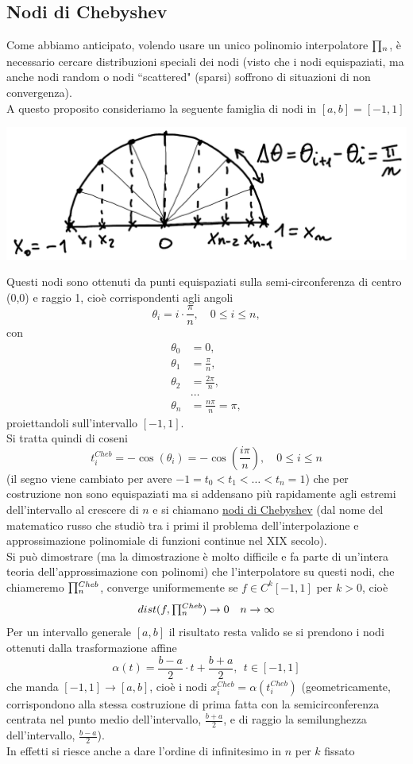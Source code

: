 \subsection{Nodi di Chebyshev}
Come abbiamo anticipato, volendo usare un unico polinomio interpolatore $\begin{matrix}\prod\end{matrix}_n$, è necessario cercare distribuzioni speciali dei nodi (visto che i nodi equispaziati, ma anche nodi random o nodi ``scattered" (sparsi) soffrono di situazioni di non convergenza).\\
A questo proposito consideriamo la seguente famiglia di nodi in $[a,b]=[-1,1]$
\begin{center}
    \includegraphics[scale=0.5]{foto/pag-16}
\end{center}
Questi nodi sono ottenuti da punti equispaziati sulla semi-circonferenza di centro (0,0) e raggio 1, cioè corrispondenti agli angoli 
\[\theta_i=i\cdot \frac{\pi}{n}, \quad 0\leq i\leq n,\] 
con 
\[\begin{split}
    \theta_0 & = 0, \\
    \theta_1 & = \frac{\pi}{n}, \\
    \theta_2 & = \frac{2\pi}{n}, \\
    & \dotso \\
    \theta_n & = \frac{n\pi}{n}=\pi,
\end{split}\]
 proiettandoli sull'intervallo $[-1,1]$.\\ 
 Si tratta quindi di coseni 
\[ t_i^{Cheb}=-\cos(\theta_i)=-\cos\left(\frac{i\pi}{n}\right),\quad 0\leq i\leq n \]
(il segno viene cambiato per avere $-1=t_0< t_1<\dotso<t_n=1$) che per costruzione non sono equispaziati ma si addensano  più rapidamente agli estremi dell'intervallo al crescere di $n$ e si chiamano \uline{nodi di Chebyshev} (dal nome del matematico russo che studiò tra i primi il problema dell'interpolazione e approssimazione polinomiale di funzioni continue nel XIX secolo).\\ 
Si può dimostrare (ma la dimostrazione è molto difficile e fa parte di un'intera teoria dell'approssimazione con polinomi) che l'interpolatore su questi nodi, che chiameremo $\begin{matrix}\prod\end{matrix}_n^{Cheb}$, converge uniformemente se $f\in C^k[-1,1]$ per $k>0$, cioè
\[ dist(f,\begin{matrix}\prod\end{matrix}_n^{Cheb})\rightarrow 0 \quad n\rightarrow\infty \]
Per un intervallo generale $[a,b]$ il risultato resta valido se si prendono i nodi ottenuti dalla trasformazione affine
\[ \alpha(t)=\frac{b-a}{2}\cdot t+\frac{b+a}{2},\ \ t\in[-1,1] \]
che manda $[-1,1] \rightarrow [a,b]$, cioè i nodi $x_i^{Cheb}=\alpha(t_i^{Cheb})$ (geometricamente, corrispondono alla stessa costruzione di prima fatta con la semicirconferenza centrata nel punto medio dell'intervallo, $\frac{b+a}{2}$, e di raggio la semilunghezza dell'intervallo, $\frac{b-a}{2}$).\\
In effetti si riesce anche a dare l'ordine di infinitesimo in $n$ per $k$ fissato

